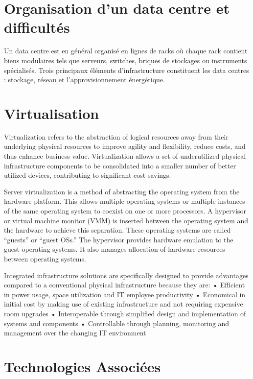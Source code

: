\section{Organisation d'un data centre et difficultés}

Un data centre est en général organisé en lignes de racks où chaque rack contient biens modulaires tels que serveurs, switches, briques de stockages ou instruments spécialisés. Trois principaux éléments d'infrastructure constituent les data centres : stockage, réseau et l'approvisionnement énergétique.

\section{Virtualisation}

Virtualization refers to the abstraction of logical resources away from their underlying physical resources to improve agility and flexibility, reduce costs, and thus enhance business value. Virtualization allows a set of underutilized physical infrastructure components to be consolidated into a smaller number of better utilized devices, contributing to significant cost savings.

Server virtualization is a method of abstracting the operating system from the hardware platform. This allows multiple operating systems or multiple instances of the same operating system to coexist on one or more processors. A hypervisor or virtual machine monitor (VMM) is inserted between the operating system and the hardware to achieve this separation. These operating systems are called “guests” or “guest OSs.” The hypervisor provides hardware emulation to the guest operating systems. It also manages allocation of hardware resources between operating systems.


Integrated infrastructure solutions are specifically designed to provide advantages compared to a conventional physical infrastructure because they are: 
•	 Efficient in power usage, space utilization and IT employee productivity
•	 Economical in initial cost by making use of existing infrastructure and not requiring expensive room upgrades
•	 Interoperable through simplified design and implementation of systems and components 
•	 Controllable through planning, monitoring and management over the changing IT environment

\section{Technologies Associées}

